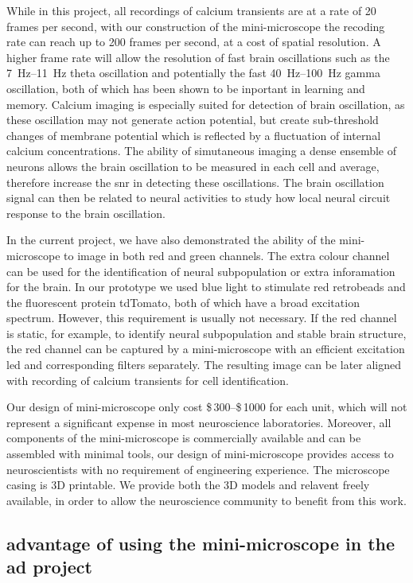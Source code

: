 While in this project, all recordings of calcium transients are at a rate of \num{20} frames per second, with our construction of the mini-microscope the recoding rate can reach up to \num{200} frames per second, at a cost of spatial resolution. A higher frame rate will allow the resolution of fast brain oscillations such as the \SIrange{7}{11}{\hertz} theta oscillation and potentially the fast \SIrange{40}{100}{\hertz} gamma oscillation, both of which has been shown to be inportant in learning and memory. Calcium imaging is especially suited for detection of brain oscillation, as these oscillation may not generate action potential, but create sub-threshold changes of membrane potential which is reflected by a fluctuation of internal calcium concentrations. The ability of simutaneous imaging a dense ensemble of neurons allows the brain oscillation to be measured in each cell and average, therefore increase the \gls{snr} in detecting these oscillations. The brain oscillation signal can then be related to neural activities to study how local neural circuit response to the brain oscillation. 

In the current project, we have also demonstrated the ability of the mini-microscope to image in both red and green channels. The extra colour channel can be used for the identification of neural subpopulation or extra inforamation for the brain. In our prototype we used blue light to stimulate red retrobeads and the fluorescent protein tdTomato, both of which have a broad excitation spectrum. However, this requirement is usually not necessary. If the red channel is static, for example, to identify neural subpopulation and stable brain structure, the red channel can be captured by a mini-microscope with an efficient excitation \gls{led} and corresponding filters separately. The resulting image can be later aligned with recording of calcium transients for cell identification. 

Our design of mini-microscope only cost \$\,300--\$\,1000 for each unit, which will not represent a significant expense in most neuroscience laboratories. Moreover, all components of the mini-microscope is commercially available and can be assembled with minimal tools, our design of mini-microscope provides access to neuroscientists with no requirement of engineering experience. The microscope casing is 3D printable. We provide both the 3D models and relavent freely available, in order to allow the neuroscience community to benefit from this work. 

\subsection{advantage of using the mini-microscope in the \gls{ad} project}

